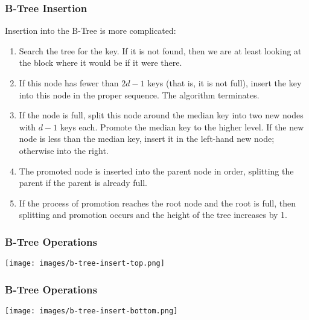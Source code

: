 \begin{frame}
\frametitle{B-Tree Insertion}

Insertion into the B-Tree is more complicated:

\begin{enumerate}
	\item Search the tree for the key. If it is not found, then we are at least looking at the block where it would be if it were there.
	\item If this node has fewer than $2d-1$ keys (that is, it is not full), insert the key into this node in the proper sequence. The algorithm terminates.
	\item If the node is full, split this node around the median key into two new nodes with $d-1$ keys each. Promote the median key to the higher level. If the new node is less than the median key, insert it in the left-hand new node; otherwise into the right.
	\item The promoted node is inserted into the parent node in order, splitting the parent if the parent is already full.
	\item If the process of promotion reaches the root node and the root is full, then splitting and promotion occurs and the height of the tree increases by 1.
\end{enumerate}


\end{frame}



\begin{frame}
\frametitle{B-Tree Operations}


\begin{center}
	\texttt{[image: images/b-tree-insert-top.png]}
\end{center}


\end{frame}

\begin{frame}
\frametitle{B-Tree Operations}


\begin{center}
	\texttt{[image: images/b-tree-insert-bottom.png]}
\end{center}


\end{frame}



